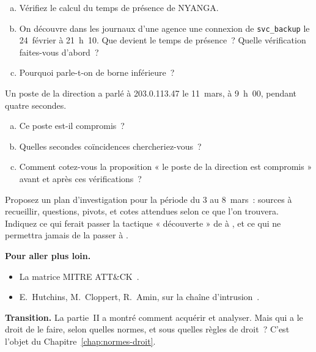 \begin{boxexo}[title={\ding{45}\quad Exercice~7.2. Le temps de présence \niveaumoyen}]
\begin{enumerate}[(a)]
    \item Vérifiez le calcul du temps de présence de NYANGA.
    \item On découvre dans les journaux d'une agence une connexion de
          \texttt{svc\_backup} le 24~février à 21~h~10. Que devient le temps
          de présence~? Quelle vérification faites-vous d'abord~?
    \item Pourquoi parle-t-on de borne inférieure~?
\end{enumerate}
\end{boxexo}

\begin{boxexo}[title={\ding{45}\quad Exercice~7.3. Un pivot trompeur \niveaumoyen}]
Un poste de la direction a parlé à 203.0.113.47 le 11~mars, à 9~h~00, pendant
quatre secondes.
\begin{enumerate}[(a)]
    \item Ce poste est-il compromis~?
    \item Quelles secondes coïncidences chercheriez-vous~?
    \item Comment cotez-vous la proposition « le poste de la direction est
          compromis » avant et après ces vérifications~?
\end{enumerate}
\end{boxexo}

\begin{boxexo}[title={\ding{45}\quad Exercice~7.4. Combler le trou \niveauexpert}]
Proposez un plan d'investigation pour la période du 3 au 8~mars~: sources à
recueillir, questions, pivots, et cotes attendues selon ce que l'on
trouvera. Indiquez ce qui ferait passer la tactique « découverte » de \NEK{}
à \OUI{}, et ce qui ne permettra jamais de la passer à \NON{}.
\end{boxexo}

\bigskip

\begin{boxinfo}
\textbf{Pour aller plus loin.}
\begin{itemize}
    \item La matrice MITRE ATT\&CK~\cite{mitreattack}.
    \item E.~Hutchins, M.~Cloppert, R.~Amin, sur la chaîne
          d'intrusion~\cite{killchain2011}.
\end{itemize}
\end{boxinfo}

\begin{boxinfo}
\textbf{Transition.} La partie~II a montré comment acquérir et analyser.
Mais qui a le droit de le faire, selon quelles normes, et sous quelles
règles de droit~? C'est l'objet du Chapitre~\ref{chap:normes-droit}.
\end{boxinfo}
